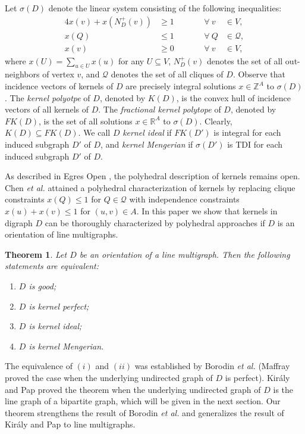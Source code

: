 \documentclass[11pt]{article}
\newtheorem{theorem}{Theorem}%
\numberwithin{theorem}{section}
\begin{document}
Let $\sigma(D)$ denote the linear system consisting of the following inequalities:
\begin{alignat}{4}
x(v)+x(N^+_{D}(v)) &\geq 1 &\qquad &\forall ~ v~&\in V, \label{domination constraints}\\
x(Q)&\leq 1 &\qquad &\forall ~ Q &\in \mathcal{Q}, \label{independence constraints}\\
x(v) &\geq 0 &\qquad &\forall ~ v~&\in V, \label{vertex nonnegativity}
\end{alignat}
where $x(U)=\sum_{u\in U}x(u)$ for any $U\subseteq V$, $N_D^+(v)$ denotes the set of all out-neighbors of vertex $v$, and $\mathcal{Q}$ denotes the set of all cliques of $D$. Observe that incidence vectors of kernels of $D$ are precisely integral solutions $x\in \mathbb{Z}^A$ to $\sigma(D)$.
The \textit{kernel polyotpe} of $D$, denoted by $K(D)$, is the convex hull of incidence vectors of all kernels of $D$.  The \textit{fractional kernel polytope} of $D$, denoted by $FK(D)$, is the set of all solutions $x\in \mathbb{R}^A$ to $\sigma(D)$. Clearly, $K(D)\subseteq FK(D)$.
We call $D$ \textit{kernel ideal} if $FK(D')$ is integral for each induced subgraph $D'$ of $D$, and \textit{kernel Mengerian} if $\sigma(D')$ is TDI for each induced subgraph $D'$ of $D$.

As described in Egres Open \cite{Egres}, the polyhedral description of kernels remains open. Chen \textit{et al.} \cite{ChenChen16} attained a polyhedral characterization of kernels by replacing clique constraints $x(Q)\leq 1$ for $Q\in\mathcal{Q}$ with independence constraints $x(u)+x(v)\leq 1$ for $(u,v)\in A$. In this paper we show that kernels in digraph $D$ can be thoroughly characterized by polyhedral approaches if $D$ is an orientation of line multigraphs.

\begin{theorem}
\label{thm:main}
Let $D$ be an orientation of a line multigraph. Then the following statements are equivalent:
\begin{enumerate}[label={\emph{(}\roman*\emph{)}}]
	\item $D$ is good;
	\item $D$ is kernel perfect;
	\item $D$ is kernel ideal;
	\item $D$ is kernel Mengerian.
\end{enumerate}
\end{theorem}

The equivalence of $(i)$ and $(ii)$ was established by Borodin \textit{et al.} \cite{BoroKost98} (Maffray \cite{Maff92} proved the case when the underlying undirected graph of $D$ is perfect). Kir\'{a}ly and Pap \cite{KiraPap08} proved the theorem when the underlying undirected graph of $D$ is the line graph of a bipartite graph, which will be given in the next section.
Our theorem strengthens the result of Borodin \textit{et al.} and generalizes the result of Kir\'{a}ly and Pap to line multigraphs.
\end{document}
